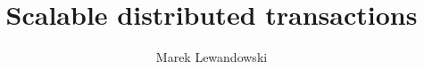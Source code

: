 \documentclass[a4paper,onecolumn,oneside,12pt]{report}
\author{Marek Lewandowski}
\title{Scalable distributed transactions}
\begin{document}
%


\newpage
\mbox{}

%

\tableofcontents



%









\listoffigures
\listoftables
\listofalgorithms
 


\end{document}
